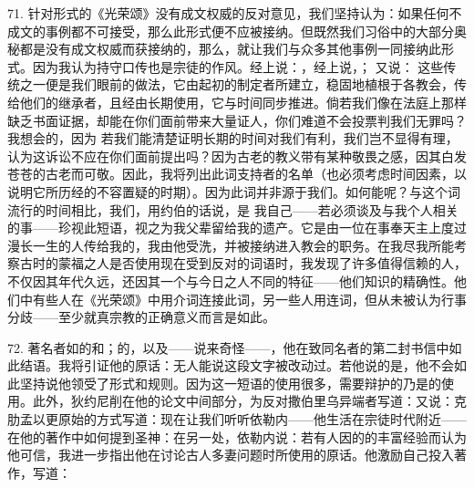 71. 针对形式的《光荣颂》没有成文权威的反对意见，我们坚持认为：如果任何不成文的事例都不可接受，那么此形式便不应被接纳。但既然我们习俗中的大部分奥秘都是没有成文权威而获接纳的，那么，就让我们与众多其他事例一同接纳此形式。因为我认为持守口传也是宗徒的作风。经上说：，经上说，； 又说： 这些传统之一便是我们眼前的做法，它由起初的制定者所建立，稳固地植根于各教会，传给他们的继承者，且经由长期使用，它与时间同步推进。倘若我们像在法庭上那样缺乏书面证据，却能在你们面前带来大量证人，你们难道不会投票判我们无罪吗？我想会的，因为 若我们能清楚证明长期的时间对我们有利，我们岂不显得有理，认为这诉讼不应在你们面前提出吗？因为古老的教义带有某种敬畏之感，因其白发苍苍的古老而可敬。因此，我将列出此词支持者的名单（也必须考虑时间因素，以说明它所历经的不容置疑的时期）。因为此词并非源于我们。如何能呢？与这个词流行的时间相比，我们，用约伯的话说，是 我自己——若必须谈及与我个人相关的事——珍视此短语，视之为我父辈留给我的遗产。它是由一位在事奉天主上度过漫长一生的人传给我的，我由他受洗，并被接纳进入教会的职务。在我尽我所能考察古时的蒙福之人是否使用现在受到反对的词语时，我发现了许多值得信赖的人，不仅因其年代久远，还因其一个与今日之人不同的特征——他们知识的精确性。他们中有些人在《光荣颂》中用介词连接此词，另一些人用连词，但从未被认为行事分歧——至少就真宗教的正确意义而言是如此。\par

72. 著名者如的和；的，以及——说来奇怪——，他在致同名者的第二封书信中如此结语。我将引证他的原话：无人能说这段文字被改动过。若他说的是，他不会如此坚持说他领受了形式和规则。因为这一短语的使用很多，需要辩护的乃是的使用。此外，狄约尼削在他的论文中间部分，为反对撒伯里乌异端者写道：又说：克肋孟以更原始的方式写道：现在让我们听听依勒内——他生活在宗徒时代附近——在他的著作中如何提到圣神：在另一处，依勒内说：若有人因的的丰富经验而认为他可信，我进一步指出他在讨论古人多妻问题时所使用的原话。他激励自己投入著作，写道：\par

